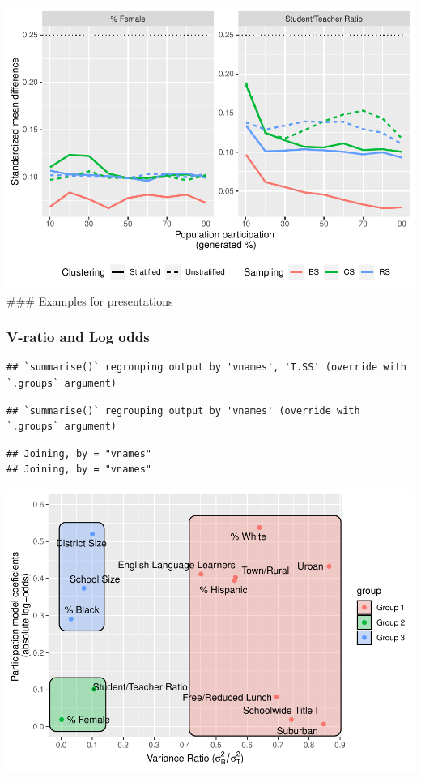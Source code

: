 \documentclass[
  english,
  man,floatsintext]{apa6}
\begin{document}
\includegraphics{5---Analysis_files/figure-latex/unnamed-chunk-16-1.pdf}
\#\#\# Examples for presentations

\hypertarget{v-ratio-and-log-odds}{%
\subsubsection{V-ratio and Log odds}\label{v-ratio-and-log-odds}}

\begin{verbatim}
## `summarise()` regrouping output by 'vnames', 'T.SS' (override with `.groups` argument)
\end{verbatim}

\begin{verbatim}
## `summarise()` regrouping output by 'vnames' (override with `.groups` argument)
\end{verbatim}

\begin{verbatim}
## Joining, by = "vnames"
## Joining, by = "vnames"
\end{verbatim}

\includegraphics{5---Analysis_files/figure-latex/unnamed-chunk-18-1.pdf}
\end{document}
